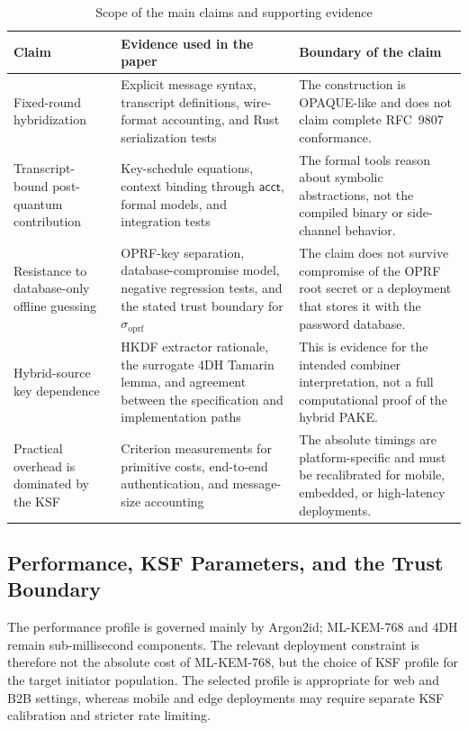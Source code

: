 \documentclass[preprint,12pt]{elsarticle}
\newcommand{\acct}{\mathsf{acct}}
\newcommand{\sigoprf}{\sigma_{\mathrm{oprf}}}
\theoremstyle{remark}
\begin{document}
\begin{table}[htbp]
\caption{Scope of the main claims and supporting evidence}
\label{tab:claim-scope}
\centering\scriptsize
\begin{tabularx}{\textwidth}{@{}L{3.0cm}L{5.2cm}X@{}}
\toprule
Claim & Evidence used in the paper & Boundary of the claim \\
\midrule
Fixed-round hybridization & Explicit message syntax, transcript
definitions, wire-format accounting, and Rust serialization tests &
The construction is OPAQUE-like and does not claim complete
RFC~9807 conformance. \\
Transcript-bound post-quantum contribution & Key-schedule equations,
context binding through $\acct$, formal models, and integration tests &
The formal tools reason about symbolic abstractions, not the compiled
binary or side-channel behavior. \\
Resistance to database-only offline guessing & OPRF-key separation,
database-compromise model, negative regression tests, and the stated
trust boundary for $\sigoprf$ & The claim does not survive compromise of
the OPRF root secret or a deployment that stores it with the password
database. \\
Hybrid-source key dependence & HKDF extractor rationale, the
surrogate 4DH Tamarin lemma, and agreement between the specification and
implementation paths & This is evidence for the intended combiner
interpretation, not a full computational proof of the hybrid PAKE. \\
Practical overhead is dominated by the KSF & Criterion measurements for
primitive costs, end-to-end authentication, and message-size accounting &
The absolute timings are platform-specific and must be recalibrated for
mobile, embedded, or high-latency deployments. \\
\bottomrule
\end{tabularx}
\end{table}

\subsection{Performance, KSF Parameters, and the Trust Boundary}

The performance profile is governed mainly by Argon2id; ML-KEM-768 and
4DH remain sub-millisecond components. The relevant deployment constraint
is therefore not the absolute cost of ML-KEM-768, but the choice of KSF
profile for the target initiator population. The selected profile is
appropriate for web and B2B settings, whereas mobile and edge
deployments may require separate KSF calibration and stricter rate
limiting.
\end{document}
